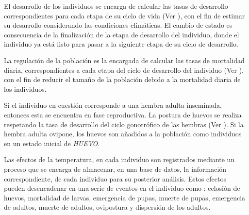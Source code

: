 El desarrollo de los individuos se encarga de calcular las tasas de desarrollo correspondientes
para cada etapa de su ciclo de vida (Ver 
), con el fin de estimar su desarrollo considerando las condiciones climáticas. El cambio de
estado es consecuencia de la finalización de la etapa de desarrollo del individuo, donde el
individuo ya está listo para pasar a la siguiente etapa de su ciclo de desarrollo.


La regulación de la población es la encargada de calcular las tasas de mortalidad diaria,
correspondientes a cada etapa del ciclo de desarrollo del individuo (Ver
), con el fin de reducir el tamaño de la población debido a la
mortalidad diaria de los individuos.

Si el individuo en cuestión corresponde a una hembra adulta inseminada, entonces esta se encuentra
en fase reproductiva. La postura de huevos se realiza respetando la tasa de desarrollo del ciclo
gonotrófico de las hembras (Ver ). Si la hembra
adulta ovipone, los huevos son añadidos a la población como individuos en un estado inicial de
\textit{HUEVO}.

Las efectos de la temperatura, en cada individuo son registrados mediante un proceso que se
encarga de almacenar, en una base de datos, la información correspondiente, de cada individuo para
su posterior análisis. Estos efectos pueden desencadenar en una serie de eventos en el individuo
como : eclosión de huevos, mortalidad de larvas, emergencia de pupas, muerte de pupas, emergencia
de adultos, muerte de adultos, ovipostura y dispersión de los adultos.
